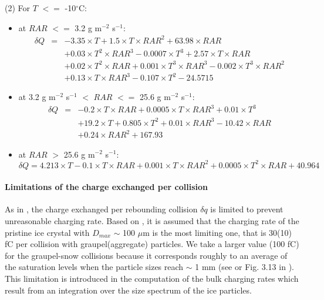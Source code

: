 \noindent
(2) For $T$ $<=$ -10$^{\circ}$C:
\begin{itemize}
  \item at $RAR$ $<=$ 3.2 g m$^{-2}$ s$^{-1}$:
\begin{eqnarray}
 \delta Q & = & -3.35 \times T + 1.5 \times T \times RAR^{2} + 63.98 \times RAR \nonumber \\
          &   & + 0.03 \times T^{2} \times RAR^{3} - 0.0007 \times T^{3} + 2.57 \times T \times RAR \nonumber \\
          &   & + 0.02 \times T^{2} \times RAR + 0.001 \times T^{3} \times RAR^{3} - 0.002 \times T^{3} \times RAR^{2} \nonumber \\
          &   & + 0.13 \times T \times RAR^{3} - 0.107 \times T^{2} - 24.5715
\end{eqnarray}
  \item at 3.2 g m$^{-2}$ s$^{-1}$ $<$ $RAR$ $<=$ 25.6 g m$^{-2}$ s$^{-1}$:
\begin{eqnarray}
 \delta Q & = & -0.2 \times T \times RAR + 0.0005 \times T \times RAR^{3} + 0.01 \times T^{3} \nonumber \\
          &   & + 19.2 \times T + 0.805 \times T^{2} + 0.01 \times RAR^{3} - 10.42 \times RAR \nonumber \\
          &   & + 0.24 \times RAR^{2} + 167.93
\end{eqnarray}
  \item at $RAR$ $>$ 25.6 g m$^{-2}$ s$^{-1}$:
\begin{equation}
 \delta Q = 4.213 \times T - 0.1 \times T \times RAR + 0.001 \times T \times RAR^{2} + 0.0005 \times T^{2} \times RAR + 40.964
\end{equation}
\end{itemize}


\paragraph{Limitations of the charge exchanged per collision}

As in \citet{Mansell-2005}, the charge exchanged per rebounding collision $\delta q$ is limited to prevent unreasonable charging rate.
Based on \citet{Keith-1990}, it is assumed that the charging rate of the pristine ice crystal with $D_{max}$ $\sim$ 100 $\mu$m is the most limiting one, that is 30(10) fC per collision with graupel(aggregate) particles.
We take a larger value (100 fC) for the graupel-snow collisions because it corresponds roughly to an average of the saturation levels when the particle sizes reach $\sim$ 1 mm (see \citet{Keith-1990} or Fig. 3.13 in \citet{MacGorman-Rust}).
This limitation is introduced in the computation of the bulk charging rates which result from an integration over the size spectrum of the ice particles.


